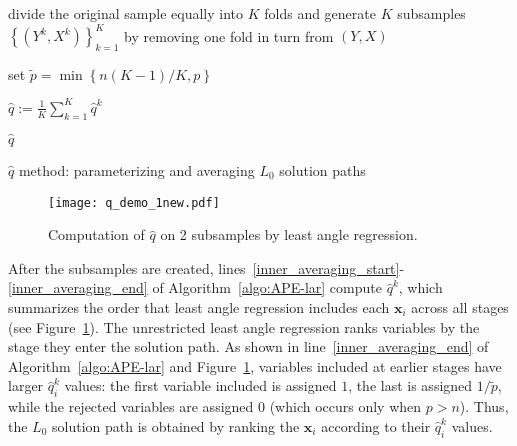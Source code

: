\documentclass[11pt,review,authoryear]{elsarticle}
\begin{document}
\smallskip
\begin{algorithm}[ht]


  \smallskip

  divide the original sample equally into $K$ folds and generate $K$ subsamples $\left\{ \left( Y^k, X^k \right) \right\}^{K}_{k=1}$ by removing one fold in turn from $\left( Y, X \right)$\;

  set $\widetilde{p} = \min\left\{ n\left(K-1\right)/K, p \right\}$\;


  $\widehat{q} := \frac{1}{K} \sum_{k=1}^{K} \widehat{q}^k$\; 

  \Return $\widehat{q}$

\caption{$\widehat{q}$ method: parameterizing and averaging $L_0$ solution paths} \label{algo:APE-lar}

\end{algorithm}


\begin{figure}[ht]
%
  \centering
%
  \texttt{[image: q\_demo\_1new.pdf]}
%
  \caption{Computation of $\widehat{q}$ on 2 subsamples by least angle regression.}
%
  \label{fig:q_demo}
%
\end{figure}

After the subsamples are created, lines~\ref{inner_averaging_start}-\ref{inner_averaging_end} of Algorithm~\ref{algo:APE-lar} compute $\widehat{q}^k$, which summarizes the order that least angle regression includes each $\mathbf{x}_i$ across all stages (see Figure~\ref{fig:q_demo}). The unrestricted least angle regression ranks variables by the stage they enter the solution path. As shown in line~\ref{inner_averaging_end} of Algorithm~\ref{algo:APE-lar} and Figure~\ref{fig:q_demo}, variables included at earlier stages have larger $\widehat{q}^k_i$ values: the first variable included is assigned $1$, the last is assigned $1/\widetilde{p}$, while the rejected variables are assigned $0$ (which occurs only when $p > n$). Thus, the $L_0$ solution path is obtained by ranking the $\mathbf{x}_i$ according to their $\widehat{q}^k_i$ values.
\end{document}

